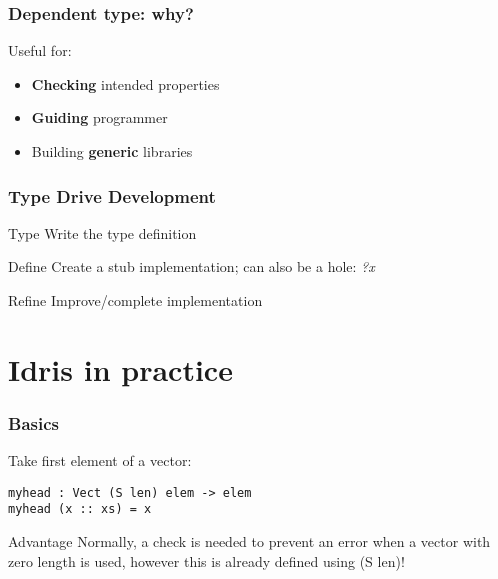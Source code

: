 \documentclass{beamer}
\begin{document}
\begin{frame}
\frametitle{Dependent type: why?}
	Useful for:
	\begin{itemize}
		\item \textbf{Checking} intended properties
		\item \textbf{Guiding} programmer
		\item Building \textbf{generic} libraries
	\end{itemize}

\end{frame}

\begin{frame}
\frametitle{Type Drive Development}
\begin{alertblock}{Type}
	Write the type definition 
\end{alertblock}	

\begin{alertblock}{Define}
	Create a stub implementation; can also be a hole: \textit{?x}
\end{alertblock}

\begin{alertblock}{Refine}
	Improve/complete implementation
\end{alertblock}

\end{frame}

\section{Idris in practice}


\begin{frame}[fragile]
\frametitle{Basics}
\begin{example}
Take first element of a vector:
\end{example}

\begin{lstlisting}
myhead : Vect (S len) elem -> elem
myhead (x :: xs) = x
\end{lstlisting}

\begin{block}{Advantage}
	Normally, a check is needed to prevent an error when a vector with zero length is used, however this is already defined using (S len)!
\end{block}


\end{frame}
\end{document}
